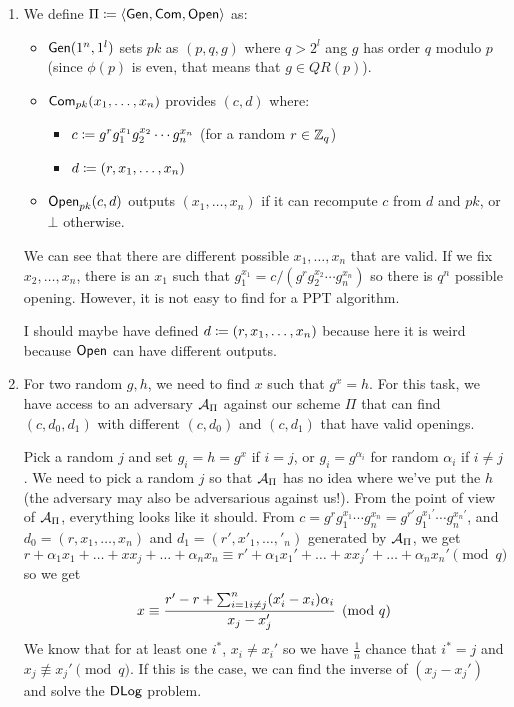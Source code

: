 \begin{solution}
	\begin{enumerate}
		\item
		We define $\Pi\coloneqq\langle \operatorname{\mathsf{Gen}}, \operatorname{\mathsf{Com}}, \operatorname{\mathsf{Open}} \rangle$ as:
		\begin{itemize}
			\item $\operatorname{\mathsf{Gen}}(1^n, 1^l)$ sets $pk$ as $(p,q,g)$ where $q > 2^l$ ang $g$ has order $q$ modulo $p$ (since $\phi(p)$ is even, that means that $g \in QR(p)$).
			\item $\operatorname{\mathsf{Com}}_{pk}(x_1, \ldots, x_n)$ provides $(c,d)$ where:
			\begin{itemize}
				\item $c \coloneqq g^r g_1^{x_1} g_2^{x_2} \cdots g_n^{x_n}$ (for a random $r \in \mathbb{Z}_q$)
				\item $d \coloneqq (r,x_1,\dots,x_n)$
			\end{itemize}
			\item $\operatorname{\mathsf{Open}}_{pk}(c,d)$ outputs $(x_1, \dots, x_n)$ if it can recompute $c$ from $d$ and $pk$,
			or $\bot$ otherwise.
		\end{itemize}
		We can see that there are different possible $x_1, \dots, x_n$ that are valid.
		If we fix $x_2, \dots, x_n$,
		there is an $x_1$ such that $g_1^{x_1} = c / (g^r g_2^{x_2} \cdots g_n^{x_n})$
		so there is $q^n$ possible opening.
		However, it is not easy to find for a PPT algorithm.

		I should maybe have defined $d \coloneqq (r, x_1, \dots, x_n)$ because here it is weird because $\operatorname{\mathsf{Open}}$ can have different outputs.
		\item %

		For two random $g, h$, we need to find $x$ such that $g^x=h$.
		For this task, we have access to an adversary $\mathcal{A}_\Pi$ against our scheme $\Pi$ that can find $(c, d_0, d_1)$ with different $(c, d_0)$ and $(c, d_1)$ that have valid openings.

		Pick a random $j$ and set $g_{i} = h = g^x$ if $i=j$, or $g_i = g^{\alpha_i}$ for random $\alpha_i$ if $i\neq j$.
		We need to pick a random $j$ so that $\mathcal{A}_\Pi$ has no idea where we've put the $h$ (the adversary may also be adversarious against us!).
		From the point of view of $\mathcal{A}_\Pi$, everything looks like it should.
		From $c = g^rg_1^{x_1} \cdots g_n^{x_n} = g^{r'}g_1^{x_1'} \cdots g_n^{x_n'}$, and $d_0=(r, x_1, \dots, x_n)$ and $d_1=(r', x'_1, \dots, '_n)$ generated by $\mathcal{A}_\Pi$, we get
		\[ r + \alpha_1 x_1 + \dots + x x_j + \dots + \alpha_n x_n \equiv r' + \alpha_1 x_1' + \dots + x x_j' + \dots + \alpha_n x_n' \pmod{q} \]
		so we get
		\[ x \equiv \frac{ r' - r + \sum_{i=1\\i \neq j}^n (x_i' - x_i) \alpha_i}{x_j-x_j'} \pmod{q} \]
		We know that for at least one $i^*$, $x_i \neq x_i'$ so we have $\frac{1}{n}$ chance that $i^*=j$ and $x_{j} \not\equiv x_{j}' \pmod{q}$.
		If this is the case, we can find the inverse of $(x_{j} - x_{j}')$ and solve the $\mathsf{DLog}$ problem.


\end{enumerate}
\end{solution}
